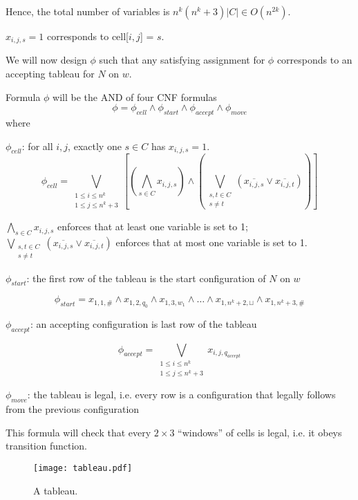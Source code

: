 Hence, the total number of variables is $n^k(n^k + 3)|C| \in O(n^{2k})$.

$x_{i,j,s} = 1$ corresponds to cell[$i,j$] = $s$.

We will now design $\phi$ such that any satisfying assignment for $\phi$ corresponds to an accepting tableau for $N$ on $w$.

Formula $\phi$ will be the AND of four CNF formulas
$$
\phi = \phi_{cell} \land \phi_{start} \land \phi_{accept} \land \phi_{move}
$$
where

$\phi_{cell}$: for all $i,j$, exactly one $s \in C$ has $x_{i,j,s} = 1$.
$$
\phi_{cell} = \bigvee_{\substack{1 \leq i \leq n^k \\ 1 \leq j \leq n^k+3}} \left[ \left( \bigwedge_{s \in C} x_{i,j,s} \right) \land \left( \bigvee_{\substack{s,t \in C \\ s \neq t}} \left( \overline{x_{i,j,s}} \lor \overline{x_{i,j,t}} \right)  \right)  \right] 
$$

$\bigwedge_{s \in C} x_{i,j,s}$ enforces that at least one variable is set to 1; $\bigvee_{\substack{s,t \in C \\ s \neq t}} \left( \overline{x_{i,j,s}} \lor \overline{x_{i,j,t}} \right)$ enforces that at most one variable is set to 1.

$\phi_{start}$: the first row of the tableau is the start configuration of $N$ on $w$

$$
\phi_{start} = x_{1,1,\#} \land x_{1,2,q_0} \land x_{1,3,w_1} \land \ldots \land x_{1,n^k+2,\sqcup} \land x_{1,n^k+3, \#}
$$

$\phi_{accept}$: an accepting configuration is last row of the tableau

$$
\phi_{accept} = \bigvee_{\substack{1 \leq i \leq n^k \\ 1 \leq j \leq n^k + 3}} x_{i,j,q_{accept}}
$$

$\phi_{move}$: the tableau is legal, i.e. every row is a configuration that legally follows from the previous configuration

This formula will check that every $2 \times 3$ ``windows'' of cells is legal, i.e. it obeys transition function.

\begin{figure}[htbp]
    \centering
    \texttt{[image: tableau.pdf]}
    \caption{A tableau.}
    \label{fig:cook-levin-tableau}
\end{figure}

